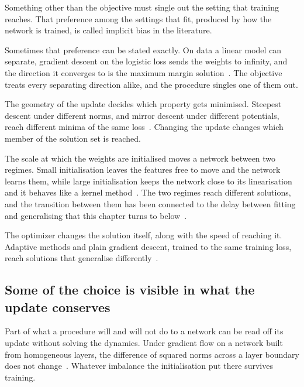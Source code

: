 Something other than the objective must single out the setting that training
reaches. That preference among the settings that fit, produced by how the
network is trained, is called implicit bias in the literature.

Sometimes that preference can be stated exactly. On data a linear model can
separate, gradient descent on the logistic loss sends the weights to infinity,
and the direction it converges to is the maximum margin
solution~\cite{soudry_implicit_2018}. The objective treats every separating
direction alike, and the procedure singles one of them out.

The geometry of the update decides which property gets minimised. Steepest descent under different norms, and mirror
descent under different potentials, reach different minima of the same
loss~\cite{gunasekar_characterizing_2018}. Changing the update changes which
member of the solution set is reached.

The scale at which the weights are initialised moves a network between two
regimes. Small initialisation leaves the features free to move and the network
learns them, while large initialisation keeps the network close to its
linearisation and it behaves like a kernel
method~\cite{woodworth_kernel_2020}. The two regimes reach different
solutions, and the transition between them has been connected to the delay
between fitting and generalising that this chapter turns to
below~\cite{kumar_grokking_2024}.

The optimizer changes the solution itself, along with the speed of reaching
it. Adaptive methods and plain gradient descent, trained to the same training
loss, reach solutions that generalise
differently~\cite{wilson_marginal_2017}.

\subsection{Some of the choice is visible in what the update conserves}
\label{sec:bg_conserved}

Part of what a procedure will and will not do to a network can be read off its
update without solving the dynamics. Under gradient flow on a network built
from homogeneous layers, the difference of squared norms across a layer
boundary does not change~\cite{du_algorithmic_2018}. Whatever imbalance the
initialisation put there survives training.

